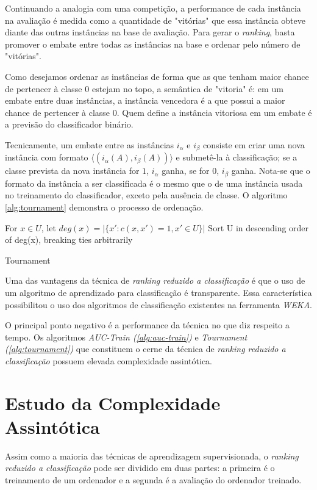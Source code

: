 Continuando a analogia com uma competição, a performance de cada instância na avaliação é medida como a quantidade de "vitórias" que essa instância obteve diante das outras instâncias na base de avaliação. Para gerar o \emph{ranking}, basta promover o embate entre todas as instâncias na base e ordenar pelo número de "vitórias".

Como desejamos ordenar as instâncias de forma que as que tenham maior chance de pertencer à classe $0$ estejam no topo, a semântica de "vitoria" é: em um embate entre duas instâncias, a instância vencedora é a que possui a maior chance de pertencer à classe $0$. Quem define a instância vitoriosa em um embate é a previsão do classificador binário.

Tecnicamente, um embate entre as instâncias $i_\alpha$ e $i_\beta$ consiste em criar uma nova instância com formato $\langle (i_{\alpha}(A), i_{\beta}(A))\rangle$ e submetê-la à classificação; se a classe prevista da nova instância for $1$, $i_{\alpha}$ ganha, se for $0$, $i_{\beta}$ ganha. Nota-se que o formato da instância a ser classificada é o mesmo que o de uma instância usada no treinamento do classificador, exceto pela ausência de classe. O algoritmo \ref{alg:tournament} demonstra o processo de ordenação.

\begin{algorithm}
    For $x \in U$, let $deg(x) = |\{x':c(x, x') = 1, x' \in U\}|$
    Sort U in descending order of deg(x), breaking ties arbitrarily
    
    \caption{Tournament}
    \label{alg:tournament}
\end{algorithm}

Uma das vantagens da técnica de \emph{ranking reduzido a classificação} é que o uso de um algoritmo de aprendizado para classificação é transparente. Essa característica possibilitou o uso dos algoritmos de classificação existentes na ferramenta \emph{WEKA}.

O principal ponto negativo é a performance da técnica no que diz respeito a tempo. Os algoritmos \emph{AUC-Train (\ref{alg:auc-train})} e \emph{Tournament (\ref{alg:tournament})} que constituem o cerne da técnica de \emph{ranking reduzido a classificação} possuem elevada complexidade assintótica.


\section{Estudo da Complexidade Assintótica}

Assim como a maioria das técnicas de aprendizagem supervisionada, o \emph{ranking reduzido a classificação} pode ser dividido em duas partes: a primeira é o treinamento de um ordenador e a segunda é a avaliação do ordenador treinado.

